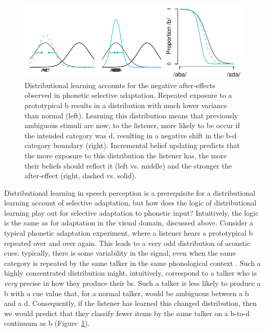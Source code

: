 \begin{figure}[ht]\centering
  \includegraphics[width=\textwidth]{schematic-adapt.pdf}
  \caption{Distributional learning accounts for the negative after-effects observed in phonetic selective adaptation.  Repeated exposure to a prototypical \ph b results in a distribution with much lower variance than normal (left).  Learning this distribution means that previously ambiguous stimuli are now, to the listener, more likely to be occur if the intended category was \ph d, resulting in a negative shift in the \ph b-\ph d category boundary (right).  Incremental belief updating predicts that the more exposure to this distribution the listener has, the more their beliefs should reflect it (left vs. middle) and the stronger the after-effect (right, dashed vs. solid).}
  \label{fig:schematic-selad}
\end{figure}

Distributional learning in speech perception is a prerequisite for a distributional learning account of selective adaptation, but how does the logic of distributional learning play out for selective adaptation to phonetic input?  Intuitively, the logic is the same as for adaptation in the visual domain, discussed above.  Consider a typical phonetic adaptation experiment, where a listener hears a prototypical \ph b repeated over and over again.  This leads to a very odd distribution of acoustic cues: typically, there is some variability in the signal, even when the same category is repeated by the same talker in the same phonological context \autocite{Allen2003,Newman2001}.  Such a highly concentrated distribution might, intuitively, correspond to a talker who is \emph{very} precise in how they produce their \ph bs.  Such a talker is less likely to produce a \ph b with a cue value that, for a normal talker, would be ambiguous between a \ph b and a \ph d.  Consequently, if the listener has learned this changed distribution, then we would predict that they classify fewer items by the same talker on a \ph b-to-\ph d continuum as \ph b (Figure~\ref{fig:schematic-selad}).

